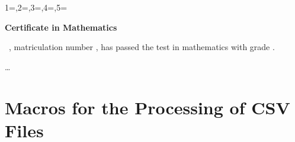 \documentclass[a4paper,11pt]{ltxdoc}
\begin{document}
\begin{dispExample}
  {1=\name,2=\firstname,3=\matnumber,4=\gender,5=\grade}{%
    \begin{center}\Large\bfseries Certificate in Mathematics\end{center}
    \large{}
    \firstname~\name, matriculation number \matnumber, has passed the test
    in mathematics with grade \grade.\par\ldots\par
  }%
\end{dispExample}


\clearpage
\section{Macros for the Processing of CSV Files}\label{sec:makros}%
\end{document}
